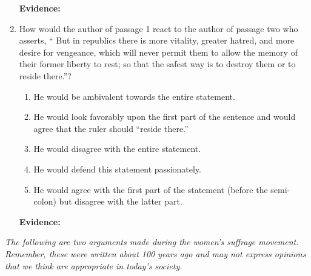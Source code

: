 \begin{enumerate}
\bigskip
\textbf{Evidence:} \hrulefill

\bigskip
\item How would the author of passage 1 react to the author of passage two who asserts, `` But in republics there is more vitality, greater hatred, and more desire for vengeance, which will never permit them to allow the memory of their former liberty to rest; so that the safest way is to destroy them or to reside there.''?

\bigskip
\begin{enumerate}[label=(\Alph*)]
\item He would be ambivalent towards the entire statement. 
\item He would look favorably upon the first part of the sentence and would agree that the ruler should ``reside there.''
\item He would disagree with the entire statement.
\item He would defend this statement passionately. 
\item He would agree with the first part of the statement (before the semi-colon) but disagree with the latter part. 
\end{enumerate}

\bigskip
\textbf{Evidence:} \hrulefill

\end{enumerate}

\bigskip
\textit{The following are two arguments made during the women's suffrage movement. Remember, these were written about 100 years ago and may not express opinions that we think are appropriate in today's society.}

